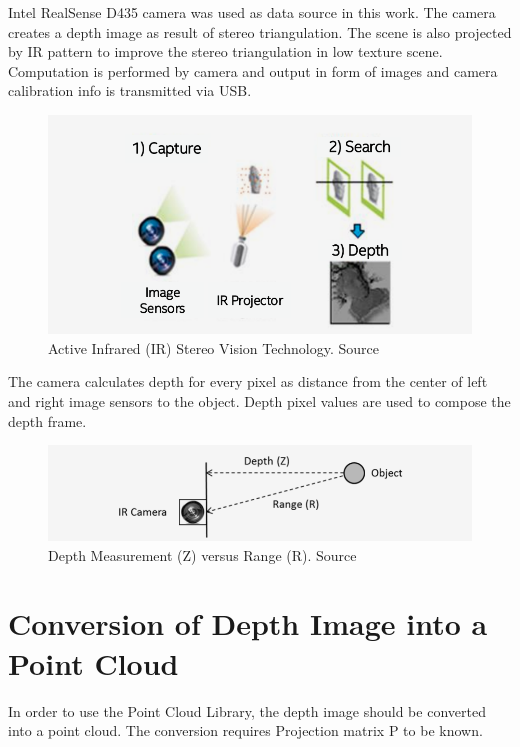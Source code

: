 \documentclass{ctuthesis}
\begin{document}
Intel RealSense D435 camera was used as data source in this work. The camera creates a depth image as result of stereo triangulation. The scene is also projected by IR pattern to improve the stereo triangulation in low texture scene. Computation is performed by camera and output in form of images and camera calibration info is transmitted via USB. 

\begin{figure}[htbp]
    \centering
    \includegraphics[width=\textwidth]{I_RS_1.png}
    \caption{Active Infrared (IR) Stereo Vision Technology. Source \cite{intel}}
    \label{fig:I_RS_1}
\end{figure}

The camera calculates depth for every pixel as distance from the center of left and right image sensors to the object. Depth pixel values are used to compose the depth frame.

\begin{figure}[htbp]
    \centering
    \includegraphics[width=\textwidth]{I_RS_2.png}
    \caption{Depth Measurement (Z) versus Range (R). Source \cite{intel}}
    \label{fig:I_RS_2}
\end{figure}

\section{Conversion of Depth Image into a Point Cloud}

In order to use the Point Cloud Library, the depth image should be converted into a point cloud. The conversion requires Projection matrix P to be known. 
\end{document}
